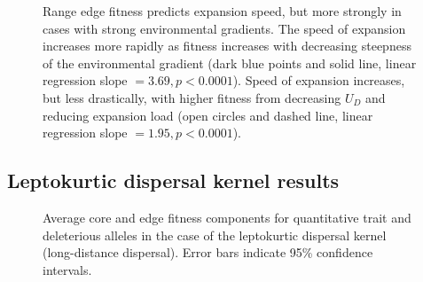
\begin{figure}[h!]
\centering
{}
\caption[Range edge fitness predicts expansion speed.]{Range edge fitness predicts expansion speed, but more strongly in cases with strong environmental gradients. The speed of expansion increases more rapidly as fitness increases with decreasing steepness of the environmental gradient (dark blue points and solid line, linear regression slope $= 3.69, p < 0.0001$). Speed of expansion increases, but less drastically, with higher fitness from decreasing $U_D$ and reducing expansion load (open circles and dashed line, linear regression slope $=1.95, p < 0.0001$).}
\label{fig:fitspeed}
\end{figure}


\clearpage{}


\subsection*{Leptokurtic dispersal kernel results}


\begin{figure}[h!]
\centering
{}
\caption[Leptokurtic dispersal kernel fitness results.]{Average core and edge fitness components for quantitative trait and deleterious alleles in the case of the leptokurtic dispersal kernel (long-distance dispersal). Error bars indicate 95\% confidence intervals.}
\label{fig:leptokurt}
\end{figure}


